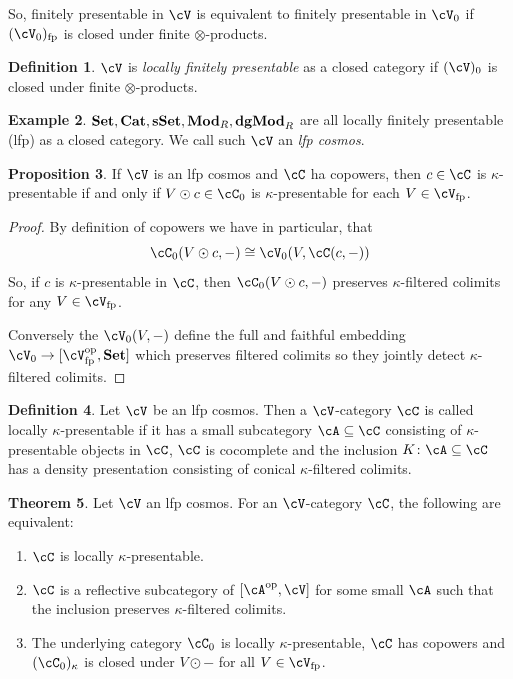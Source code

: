 \documentclass[a4paper,11pt,oneside,openany]{scrbook}
\newcommand{\catname}[1]{{\normalfont\textbf{#1}}}
\newcommand{\Set}{\catname{Set}}
\newcommand{\Mod}{\catname{Mod}}
\newcommand{\dgMod}{\catname{dgMod}}
\newcommand{\sSet}{\catname{sSet}}
\newcommand{\Cat}{\catname{Cat}}
\newcommand{\from}{\colon}
\newcommand{\iso}{\cong}
\DeclareMathOperator{\op}{\text{op}}
\theoremstyle{definition}
\newtheorem{thm}{Theorem}[section] %
\theoremstyle{definition}
\newtheorem{defn}[thm]{Definition} %
\newtheorem{prop}[thm]{Proposition}
\newtheorem{exmp}[thm]{Example}
\begin{document}
So, finitely presentable in $ \cV $ is equivalent to finitely presentable in $ \cV_0 $ if $ (\cV_0)_{\text{fp}} $ is closed under finite $ \otimes $-products.

\begin{defn}
    $ \cV $ is \emph{locally finitely presentable} as a closed category if $ (\cV)_0 $ is closed under finite $ \otimes $-products.
\end{defn}

\begin{exmp}
    $ \Set,\Cat,\sSet,\Mod_R,\dgMod_R $ are all locally finitely presentable (lfp) as a closed category. We call such $ \cV $ an \emph{lfp cosmos}.
\end{exmp}
\begin{prop}
    If $ \cV $ is an lfp cosmos and $ \cC $ ha copowers, then $ c\in \cC $ is $ \kappa $-presentable if and only if $ V\odot c \in \cC_0 $ is $ \kappa $-presentable for each $ V \in \cV_{\text{fp}} $.
\end{prop}
\begin{proof}
    By definition of copowers we have in particular, that
    \begin{displaymath}
	\cC_0(V \odot c , -) \iso \cV_0 (V , \cC(c,-))
    \end{displaymath}
    So, if $ c $ is $ \kappa $-presentable in $ \cC $, then $ \cC_0(V\odot c, -) $ preserves $ \kappa $-filtered colimits for any $ V \in \cV_{\text{fp}} $.
    
    Conversely the $ \cV_0(V,-) $ define the full and faithful embedding $ \cV_0 \to [\cV ^{\op} _{\text{fp}} , \Set ] $ which preserves filtered colimits so they jointly detect $ \kappa $-filtered colimits.
\end{proof}
\begin{defn}
    Let $ \cV $ be an lfp  cosmos. Then a $ \cV $-category $ \cC $ is called locally $ \kappa $-presentable if it has a small subcategory $ \cA \subseteq\cC  $ consisting of $ \kappa $-presentable objects in $ \cC $, $ \cC $ is cocomplete and the inclusion $ K \from \cA \subseteq\cC  $ has a density presentation consisting of conical $ \kappa $-filtered colimits.
\end{defn}
\begin{thm}
    Let $ \cV $ an lfp cosmos.
    For an $ \cV $-category $ \cC $, the following are equivalent:
    \begin{enumerate}[label=\arabic*)]
        \item
	    $ \cC $ is locally $ \kappa $-presentable.
	\item
	    $ \cC $ is a reflective subcategory of $ [\cA^{\op}, \cV] $ for some small $ \cA $ such that the inclusion preserves $ \kappa $-filtered colimits.\item
	    The underlying category $ \cC_0 $ is locally $ \kappa $-presentable, $ \cC  $ has copowers and $ (\cC_0)_{\kappa}  $ is closed under $ V\odot - $ for all $ V \in \cV_{\text{fp}} $.
    \end{enumerate}
\end{thm}
\end{document}

